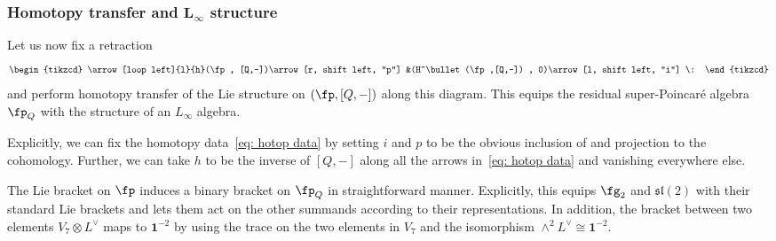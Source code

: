 \documentclass[pdftex]{sigma}
\numberwithin{equation}{section}
\theoremstyle{definition}
\def\lie#1{\ensuremath{\mathfrak{#1}}}
\def\bu{\bullet}
\begin{document}
\subsubsection[Homotopy transfer and L\_infty structure]{Homotopy transfer and $\boldsymbol{ L_\infty}$ structure}\label{p: maxtransfer}
Let us now fix a retraction
\begin{equation}
\begin{tikzcd}
\arrow[loop left]{l}{h}(\fp , [Q,-])\arrow[r, shift left, "p"] &(H^\bu(\fp,[Q,-]) , 0)\arrow[l, shift left, "i"] \:
\end{tikzcd}
\label{eq: hotop data}
\end{equation}
and perform homotopy transfer of the Lie structure on $(\fp , [Q,-])$ along this diagram. This equips the residual super-Poincar\'e algebra $\fp_Q$ with the structure of an $L_\infty$ algebra.

Explicitly, we can fix the homotopy data~\eqref{eq: hotop data} by setting $i$ and $p$ to be the obvious inclusion of and projection to the cohomology. Further, we can take $h$ to be the inverse of $[Q,-]$ along all the arrows in~\eqref{eq: hotop data} and vanishing everywhere else.

The Lie bracket on $\fp$ induces a binary bracket on $\fp_Q$ in straightforward manner. Explicitly, this equips $\fg_2$ and $\lie{sl}(2)$ with their standard Lie brackets and lets them act on the other summands according to their representations. In addition, the bracket between two elements $V_7 \otimes L^\vee$ maps to $\textbf{1}^{-2}$ by using the trace on the two elements in $V_7$ and the isomorphism $\wedge^2 L^\vee \cong \textbf{1}^{-2}$.
\end{document}
